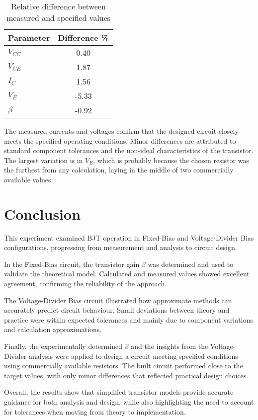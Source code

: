 \documentclass{article}
\begin{document}
\begin{table}[H]
    \centering
    \caption{Relative difference between measured and specified values}
    \begin{tabular}{l S[table-format=3.2]}
        \toprule
        Parameter & {Difference \%} \\
        \midrule
        \(V_{CC}\)  &  0.40 \\
        \(V_{CE}\)  &  1.87 \\
        \(I_C\)     &  1.56 \\
        \(V_E\)     & -5.33 \\
        \(\beta\)   & -0.92 \\
        \bottomrule
    \end{tabular}%
    \label{tab:4diff}%
\end{table}%

The measured currents and voltages confirm that the designed circuit closely meets the specified operating conditions.  
Minor differences are attributed to standard component tolerances and the non-ideal characteristics of the transistor.
The largest variation is in \(V_E\), which is probably because the chosen resistor was the furthest from any calculation, laying in the middle of two commercially available values.



\section{Conclusion}

This experiment examined BJT operation in Fixed-Bias and Voltage-Divider Bias configurations, progressing from measurement and analysis to circuit design.  

In the Fixed-Bias circuit, the transistor gain \(\beta\) was determined and used to validate the theoretical model.  
Calculated and measured values showed excellent agreement, confirming the reliability of the approach.  

The Voltage-Divider Bias circuit illustrated how approximate methods can accurately predict circuit behaviour.  
Small deviations between theory and practice were within expected tolerances and mainly due to component variations and calculation approximations.  

Finally, the experimentally determined \(\beta\) and the insights from the Voltage-Divider analysis were applied to design a circuit meeting specified conditions using commercially available resistors.  
The built circuit performed close to the target values, with only minor differences that reflected practical design choices.  

Overall, the results show that simplified transistor models provide accurate guidance for both analysis and design, while also highlighting the need to account for tolerances when moving from theory to implementation.  

\end{document}
